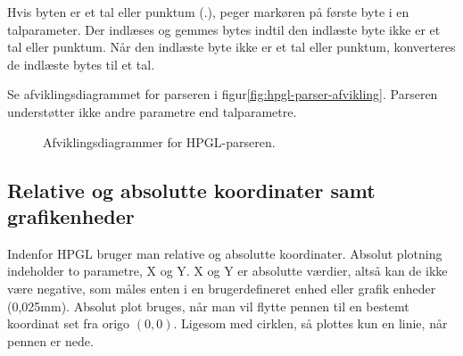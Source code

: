 Hvis byten er et tal eller punktum (.), peger markøren på første byte
i en talparameter. Der indlæses og gemmes bytes indtil den indlæste
byte ikke er et tal eller punktum. Når den indlæste byte ikke er et
tal eller punktum, konverteres de indlæste bytes til et tal.

Se afviklingsdiagrammet for parseren i
figur\vref{fig:hpgl-parser-afvikling}. Parseren understøtter ikke
andre parametre end talparametre.

\begin{figure}[htbp]
  \centering
  \qquad
  \caption{Afviklingsdiagrammer for HPGL-parseren.}
  \label{fig:hpgl-parser-afvikling}
\end{figure}


\subsection{Relative og absolutte koordinater samt grafikenheder}
\label{sc:relativ-absolut}

Indenfor HPGL bruger man relative og absolutte koordinater. Absolut
plotning indeholder to parametre, X og Y. X og Y er absolutte værdier,
altså kan de ikke være negative, som måles enten i en brugerdefineret
enhed eller grafik enheder (0,025mm). Absolut plot bruges, når man vil
flytte pennen til en bestemt koordinat set fra origo $(0, 0)$. Ligesom
med cirklen, så plottes kun en linie, når pennen er nede.


